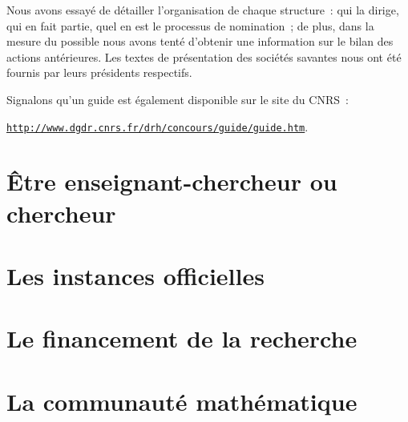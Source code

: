 \documentclass[11pt]{book}
\newcommand {\lien}[1]{{\small\tt \href{http\string://#1}{http\string://#1}}}
\begin{document}
Nous avons essay\'e de d\'etailler l'organisation de chaque structure~:
qui la dirige, qui en fait partie, quel en est le processus de
nomination~; de plus, dans la mesure du possible nous avons tent\'e
d'obtenir une information sur le bilan des actions ant\'erieures.
Les textes de pr\'e\-sen\-ta\-tion des
soci\'et\'es savantes nous ont \'et\'e
fournis par leurs pr\'esidents respectifs.

Signalons qu'un guide est \'egalement disponible sur le site du CNRS~:

\lien{www.dgdr.cnrs.fr/drh/concours/guide/guide.htm}.



\part{\^Etre enseignant-chercheur ou chercheur}








\part{Les instances officielles}


 







\part{Le financement de la recherche}





\part{La communaut\'e math\'ematique}








\printindex
\end{document}
